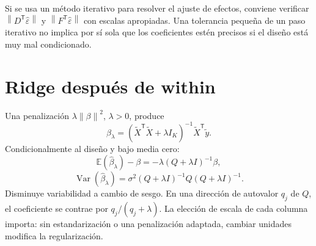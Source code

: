 \documentclass[11pt,a4paper]{article}
\newcommand{\E}{\mathbb E}
\newcommand{\T}{^{\mathsf T}}
\newcommand{\norm}[1]{\left\lVert #1\right\rVert}
\DeclareMathOperator{\Var}{Var}
\theoremstyle{definition}
\newcommand{\eps}{\varepsilon}
\begin{document}
Si se usa un método iterativo para resolver el ajuste de efectos, conviene verificar
$\norm{D\T\widehat\eps}$ y $\norm{F\T\widehat\eps}$ con escalas apropiadas.
Una tolerancia pequeña de un paso iterativo no implica por sí sola que los coeficientes estén precisos si el diseño está muy mal condicionado.

\section{Ridge después de within}
Una penalización $\lambda\norm\beta^2$, $\lambda>0$, produce
\[
\widehat\beta_\lambda
=(\widetilde X\T\widetilde X+\lambda I_K)^{-1}\widetilde X\T\widetilde y.
\]
Condicionalmente al diseño y bajo media cero:
\[
\E(\widehat\beta_\lambda)-\beta
=-\lambda(Q+\lambda I)^{-1}\beta,
\]
\[
\Var(\widehat\beta_\lambda)
=\sigma^2(Q+\lambda I)^{-1}Q(Q+\lambda I)^{-1}.
\]
Disminuye variabilidad a cambio de sesgo. En una dirección de autovalor $q_j$ de $Q$, el coeficiente se contrae por $q_j/(q_j+\lambda)$.
La elección de escala de cada columna importa: sin estandarización o una penalización adaptada, cambiar unidades modifica la regularización.
\end{document}
